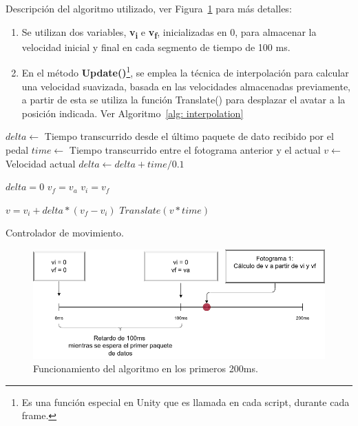 Descripción del algoritmo utilizado, ver Figura~\ref{fig: interpolation-algorithm} para más detalles:
\begin{enumerate}
    \item Se utilizan dos variables, \textbf{v\textsubscript{i}} e \textbf{v\textsubscript{f}}, inicializadas en 0, para almacenar la velocidad inicial y final en cada segmento de tiempo de 100 ms.
    \item En el método \textbf{Update()}\footnote{Es una función especial en Unity que es llamada en cada script, durante cada frame.}, se emplea la técnica de interpolación para calcular una velocidad suavizada, basada en las velocidades almacenadas previamente, a partir de esta se utiliza la función Translate() para desplazar el avatar a la posición indicada. Ver Algoritmo~\ref{alg: interpolation}
\end{enumerate} 

\begin{algorithm}[!ht]
    \SetAlgoLined

    $delta \gets$ Tiempo transcurrido desde el último paquete de dato recibido por el pedal\;
    $time \gets$ Tiempo transcurrido entre el fotograma anterior y el actual\;
    $v \gets$ Velocidad actual\;
    $delta \gets delta + time/0.1$\;

     {
        $delta = 0$\; 
        $v_{f} = v_{a}$\;
        $v_{i} = v_{f}$\;
    }

    $v = v_{i} + delta*(v_{f}-v_{i})$\;
    $Translate(v * time)$\;
\caption{Controlador de movimiento.}
\label{alg: interpolation}
\end{algorithm}

\begin{figure}[ht]
    \centering
    \includegraphics[scale=0.4]{images/interpolation-algorithm.png}
    \caption{Funcionamiento del algoritmo en los primeros 200ms.}
    \label{fig: interpolation-algorithm}
\end{figure}

